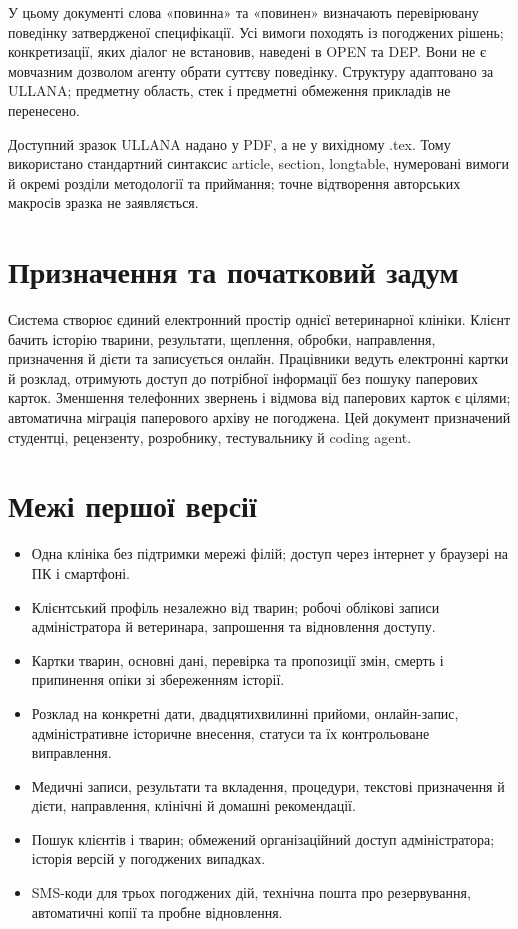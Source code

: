 \documentclass[11pt,a4paper]{article}
\begin{document}
У цьому документі слова «повинна» та «повинен» визначають перевірювану поведінку затвердженої специфікації. Усі вимоги походять із погоджених рішень; конкретизації, яких діалог не встановив, наведені в OPEN та DEP. Вони не є мовчазним дозволом агенту обрати суттєву поведінку. Структуру адаптовано за ULLANA; предметну область, стек і предметні обмеження прикладів не перенесено.

Доступний зразок ULLANA надано у PDF, а не у вихідному .tex. Тому використано стандартний синтаксис article, section, longtable, нумеровані вимоги й окремі розділи методології та приймання; точне відтворення авторських макросів зразка не заявляється.

\section{Призначення та початковий задум}
Система створює єдиний електронний простір однієї ветеринарної клініки. Клієнт бачить історію тварини, результати, щеплення, обробки, направлення, призначення й дієти та записується онлайн. Працівники ведуть електронні картки й розклад, отримують доступ до потрібної інформації без пошуку паперових карток. Зменшення телефонних звернень і відмова від паперових карток є цілями; автоматична міграція паперового архіву не погоджена. Цей документ призначений студентці, рецензенту, розробнику, тестувальнику й coding agent.

\section{Межі першої версії}
\begin{itemize}
\item Одна клініка без підтримки мережі філій; доступ через інтернет у браузері на ПК і смартфоні.
\item Клієнтський профіль незалежно від тварин; робочі облікові записи адміністратора й ветеринара, запрошення та відновлення доступу.
\item Картки тварин, основні дані, перевірка та пропозиції змін, смерть і припинення опіки зі збереженням історії.
\item Розклад на конкретні дати, двадцятихвилинні прийоми, онлайн-запис, адміністративне історичне внесення, статуси та їх контрольоване виправлення.
\item Медичні записи, результати та вкладення, процедури, текстові призначення й дієти, направлення, клінічні й домашні рекомендації.
\item Пошук клієнтів і тварин; обмежений організаційний доступ адміністратора; історія версій у погоджених випадках.
\item SMS-коди для трьох погоджених дій, технічна пошта про резервування, автоматичні копії та пробне відновлення.
\end{itemize}
\end{document}
